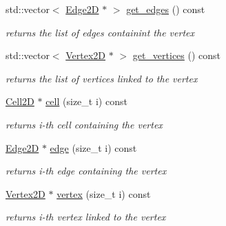 \begin{DoxyCompactItemize}
std\+::vector$<$ \hyperlink{classMeshFramework2D_1_1Edge2D}{Edge2D} $\ast$ $>$ \hyperlink{group__Mesh2D_ga5d24c13769730a614c2bf7bd515f7885}{get\+\_\+edges} () const
\begin{DoxyCompactList}\small\item\em returns the list of edges containint the vertex \end{DoxyCompactList}\item 
std\+::vector$<$ \hyperlink{classMeshFramework2D_1_1Vertex2D}{Vertex2D} $\ast$ $>$ \hyperlink{group__Mesh2D_ga597a929742c96972ebb3674b7d9ecb42}{get\+\_\+vertices} () const
\begin{DoxyCompactList}\small\item\em returns the list of vertices linked to the vertex \end{DoxyCompactList}\item 
\mbox{\label{classMeshFramework2D_1_1Vertex2D_ad5eb7914636eb9937f84370c6030aed9}} 
\hyperlink{classMeshFramework2D_1_1Cell2D}{Cell2D} $\ast$ \hyperlink{classMeshFramework2D_1_1Vertex2D_ad5eb7914636eb9937f84370c6030aed9}{cell} (size\+\_\+t i) const
\begin{DoxyCompactList}\small\item\em returns i-\/th cell containing the vertex \end{DoxyCompactList}\item 
\mbox{\label{classMeshFramework2D_1_1Vertex2D_afebfae577ee499d5309ff6a3981279de}} 
\hyperlink{classMeshFramework2D_1_1Edge2D}{Edge2D} $\ast$ \hyperlink{classMeshFramework2D_1_1Vertex2D_afebfae577ee499d5309ff6a3981279de}{edge} (size\+\_\+t i) const
\begin{DoxyCompactList}\small\item\em returns i-\/th edge containing the vertex \end{DoxyCompactList}\item 
\mbox{\label{classMeshFramework2D_1_1Vertex2D_a2094c42a5fe6dc9fa3b91cb90746eeb9}} 
\hyperlink{classMeshFramework2D_1_1Vertex2D}{Vertex2D} $\ast$ \hyperlink{classMeshFramework2D_1_1Vertex2D_a2094c42a5fe6dc9fa3b91cb90746eeb9}{vertex} (size\+\_\+t i) const
\begin{DoxyCompactList}\small\item\em returns i-\/th vertex linked to the vertex \end{DoxyCompactList}\item 

\end{DoxyCompactItemize}
